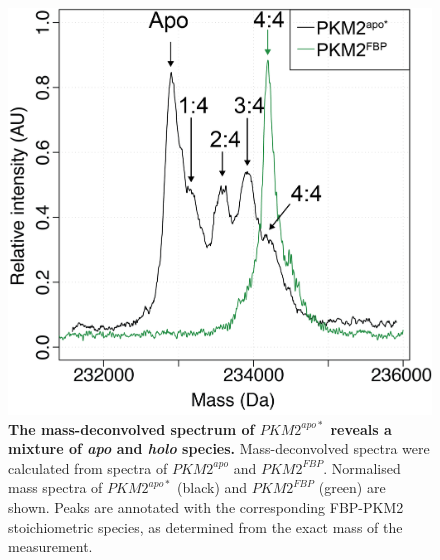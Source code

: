 %
%
%
%
%
\begin{figure}[!ht]
\includegraphics[scale=0.7]{ch5_fig3_fbp_mass_deconv.png}
\caption[The mass-deconvolved spectrum of $PKM2^{apo \ast}$ reveals a mixture of \textit{apo} and \textit{holo} species.] {\textbf{The mass-deconvolved spectrum of $PKM2^{apo \ast}$ reveals a mixture of \textit{apo} and \textit{holo} species.} Mass-deconvolved spectra were calculated from spectra of $PKM2^{apo}$ and $PKM2^{FBP}$. Normalised mass spectra of  $PKM2^{apo \ast}$ (black) and $PKM2^{FBP}$ (green) are shown. Peaks are annotated with the corresponding FBP-PKM2 stoichiometric species, as determined from the exact mass of the measurement.}
\label{fig:pkm2_mass_spectrum}
\end{figure}
%
%
\clearpage



